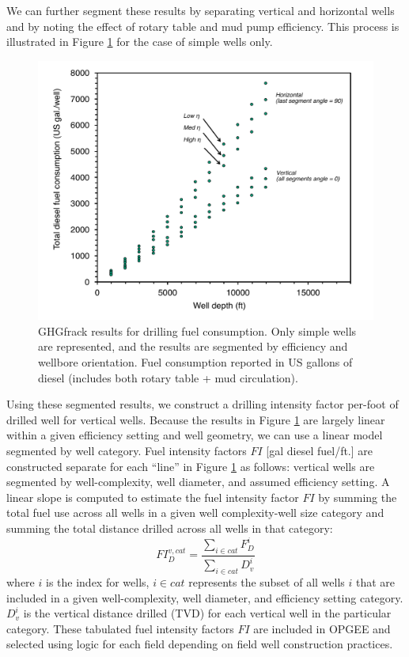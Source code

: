 \documentclass[11pt]{report}
\begin{document}
We can further segment these results by separating vertical and horizontal wells and by noting the effect of rotary table and mud pump efficiency. This process is illustrated in Figure \ref{fig:drilling3} for the case of simple wells only.

\begin{figure}[tb]
\includegraphics[width=0.8\columnwidth]{images/Drilling3.pdf}
\caption{GHGfrack results for drilling fuel consumption. Only simple wells are represented, and the results are segmented by efficiency and wellbore orientation. Fuel consumption reported in US gallons of diesel (includes both rotary table + mud circulation).}
\label{fig:drilling3}
\end{figure}

Using these segmented results, we construct a drilling intensity factor per-foot of drilled well for vertical wells.  Because the results in Figure \ref{fig:drilling3} are largely linear within a given efficiency setting and well geometry, we can use a linear model segmented by well category. Fuel intensity factors $FI$ [gal diesel fuel/ft.] are constructed separate for each ``line'' in Figure \ref{fig:drilling3} as follows: vertical wells are segmented by well-complexity, well diameter, and assumed efficiency setting.  A linear slope is computed to estimate the fuel intensity factor $FI$ by summing the total fuel use across all wells in a given well complexity-well size category and summing the total distance drilled across all wells in that category:
\begin{equation}
FI_{D}^{v,cat} = \frac{\sum_{i \in cat} F_{D}^{i}}{\sum_{i \in cat} D_{v}^{i}}
\end{equation}
where $i$ is the index for wells, $i \in cat$ represents the subset of all wells $i$ that are included in a given well-complexity, well diameter, and efficiency setting category.  $D_{v}^{i}$ is the vertical distance drilled (TVD) for each vertical well in the particular category.  These tabulated fuel intensity factors $FI$ are included in OPGEE and selected using logic for each field depending on field well construction practices.
\end{document}
